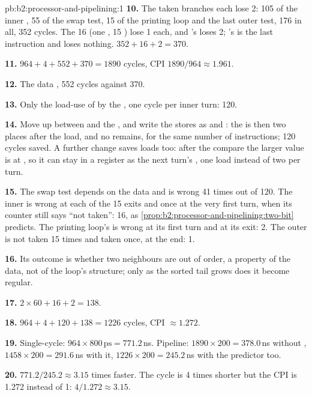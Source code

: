 \begin{solution}{pb:b2:processor-and-pipelining:1}
\textbf{10.} The taken branches each lose 2: 105 of the inner , 55 of the swap test, 15 of the printing
loop and the last outer test, 176 in all, 352 cycles. The 16  (one , 15 ) lose 1 each,
and 's  loses 2; 's  is the last instruction and loses nothing. $352 + 16 +
2 = 370$.

\textbf{11.} $964 + 4 + 552 + 370 = 1890$ cycles, CPI $1890/964 \approx 1.961$.

\textbf{12.} The data , 552 cycles against 370.

\textbf{13.} Only the load-use of  by the , one cycle per inner turn: 120.

\textbf{14.} Move  up between  and the , and write the stores as
 and : the  is then two places after the load, and no 
remains, for the same number of instructions; 120 cycles saved. A further change saves loads too: after the compare
the larger value is at , so it can stay in a register as the next turn's , one load instead of
two per turn.

\textbf{15.} The swap test depends on the data and is wrong 41 times out of 120. The inner  is wrong at
each of the 15 exits and once at the very first turn, when its counter still says ``not taken'': 16, as
\cref{prop:b2:processor-and-pipelining:two-bit} predicts. The printing loop's is wrong at its first turn and at its
exit: 2. The outer  is not taken 15 times and taken once, at the end: 1.

\textbf{16.} Its outcome is whether two neighbours are out of order, a property of the data, not of the loop's
structure; only as the sorted tail grows does it become regular.

\textbf{17.} $2 \times 60 + 16 + 2 = 138$.

\textbf{18.} $964 + 4 + 120 + 138 = 1226$ cycles, CPI $\approx 1.272$.

\textbf{19.} Single-cycle: $964 \times 800\,\text{ps} = 771.2$\,ns. Pipeline: $1890 \times 200 = 378.0$\,ns without
, $1458 \times 200 = 291.6$\,ns with it, $1226 \times 200 = 245.2$\,ns with the predictor too.

\textbf{20.} $771.2 / 245.2 \approx 3.15$ times faster. The cycle is 4 times shorter but the CPI is 1.272 instead of 1:
$4 / 1.272 \approx 3.15$.


\end{solution}
